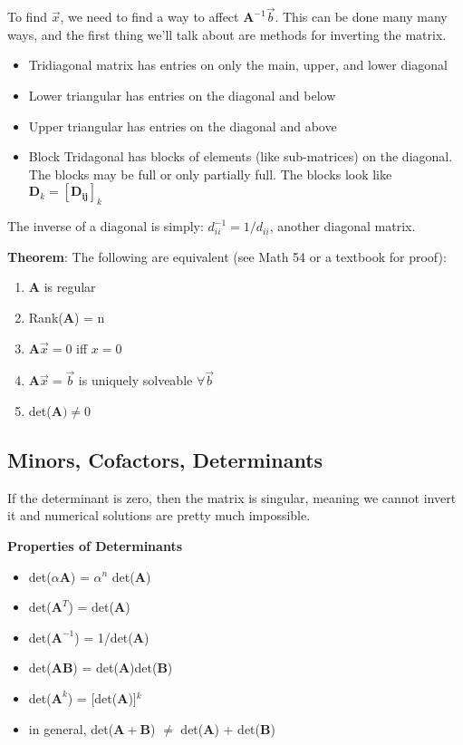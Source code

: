 \documentclass[12pt]{article}
\newcommand{\ve}[1]{\ensuremath{\mathbf{#1}}}
\begin{document}
To find $\vec{x}$, we need to find a way to affect $\ve{A}^{-1}\vec{b}$. This can be done many many ways, and the first thing we'll talk about are methods for inverting the matrix.

\begin{itemize}
\item Tridiagonal matrix has entries on only the main, upper, and lower diagonal
\item Lower triangular has entries on the diagonal and below
\item Upper triangular has entries on the diagonal and above 
\item Block Tridagonal has blocks of elements (like sub-matrices) on the diagonal. The blocks may be full or only partially full. The blocks look like $\ve{D}_k = [\ve{D_{ij}}]_k$
\end{itemize}

The inverse of a diagonal is simply: $d_{ii}^{-1} = 1/d_{ii}$, another diagonal matrix.

\textbf{Theorem}: The following are equivalent (see Math 54 or a textbook for proof):
%
\begin{enumerate}
\item $\ve{A}$ is regular
\item Rank($\ve{A}$) = n
\item $\ve{A}\vec{x} = 0$ iff $x=0$
\item $\ve{A}\vec{x} = \vec{b}$ is uniquely solveable $\forall \vec{b}$
\item det($\ve{A}) \neq 0$
\end{enumerate}


\subsection{Minors, Cofactors, Determinants}


If the determinant is zero, then the matrix is singular, meaning we cannot invert it and numerical solutions are pretty much impossible.

\textbf{Properties of Determinants}
\begin{itemize}
\item det($\alpha\ve{A}$) = $\alpha^n$ det($\ve{A}$)

\item det($\ve{A}^T$) = det($\ve{A}$)

\item det($\ve{A}^{-1}$) = 1/det($\ve{A}$)

\item det($\ve{AB}$) = det($\ve{A}$)det($\ve{B}$)

\item det($\ve{A}^k$) = [det($\ve{A}$)]$^k$

\item in general, det($\ve{A + B}$) $\neq$ det($\ve{A}$) + det($\ve{B}$) 
\end{itemize}
\end{document}
